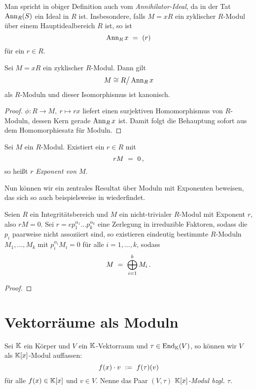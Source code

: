 \begin{bemerkung}
  Man spricht in obiger Definition auch vom \emph{Annihilator-Ideal}, da in der
  Tat $\operatorname{Ann}_R(S)$ ein Ideal in $R$ ist. Insbesondere, falls 
  $M = xR$ ein zyklischer $R$-Modul über einem Hauptidealbereich $R$ ist, so
  ist 
  \[ \operatorname{Ann}_R x \ =\  (r)\]
  für ein $r\in R$.
\end{bemerkung}


\begin{lemma}
  Sei $M = xR$ ein zyklischer $R$-Modul. Dann gilt
  \[M \cong R\big/\operatorname{Ann}_Rx\]
  als $R$-Moduln und dieser Isomorphismus ist kanonisch.
\end{lemma}
\begin{proof}
  $\phi:R \to M,\ r \mapsto rx$ liefert einen surjektiven Homomorphismus von
  $R$-Moduln, dessen Kern gerade $\operatorname{Ann}_Rx$ ist. Damit folgt die Behauptung
  sofort aus dem Homomorphiesatz für Moduln.
\end{proof}

\begin{definition}
  Sei $M$ ein $R$-Modul. Existiert ein $r \in R$ mit
  \[ rM \ =\  0\,,\]
  so heißt $r$ \emph{Exponent von $M$}.
\end{definition}


Nun können wir ein zentrales Resultat über Moduln mit Exponenten beweisen, das
sich so auch beispielsweise in \autocite[Lemma 8.10]{hartley1974rings}
wiederfindet.

\begin{satz}
  Seien $R$ ein Integritätsbereich und 
  $M$ ein nicht-trivialer $R$-Modul mit Exponent $r$, also $rM = 0$.
  Sei $r = e p_1^{\alpha_1}\ldots p_k^{\alpha_k}$ eine Zerlegung in irreduzible
  Faktoren, sodass die $p_i$ paarweise nicht assoziiert sind, 
  so existieren eindeutig bestimmte $R$-Moduln 
  $M_1,\ldots,M_k$ mit $p_i^{\alpha_i}M_i = 0$ für alle $i=1,\ldots,k$, sodass
  \[ M \ =\  \bigoplus_{i=1}^k M_i\,.\]
\end{satz}
\begin{proof}
  
\end{proof}


\section{Vektorräume als Moduln}

\begin{definition}[$(V,\tau)$]
  Sei $\mathbb{K}$ ein Körper und $V$ ein $\mathbb{K}$-Vektorraum und 
  $\tau \in \operatorname{End}_\mathbb{K}(V)$, so können wir $V$ als $\mathbb{K}[x]$-Modul auffassen:
  \[ f(x) \cdot v \ :=\  f(\tau)(v)\]
  für alle $f(x) \in \mathbb{K}[x]$ und $v\in V$.
  Nenne das Paar $(V,\tau)$ \emph{$\mathbb{K}[x]$-Modul bzgl. $\tau$}.
\end{definition}

